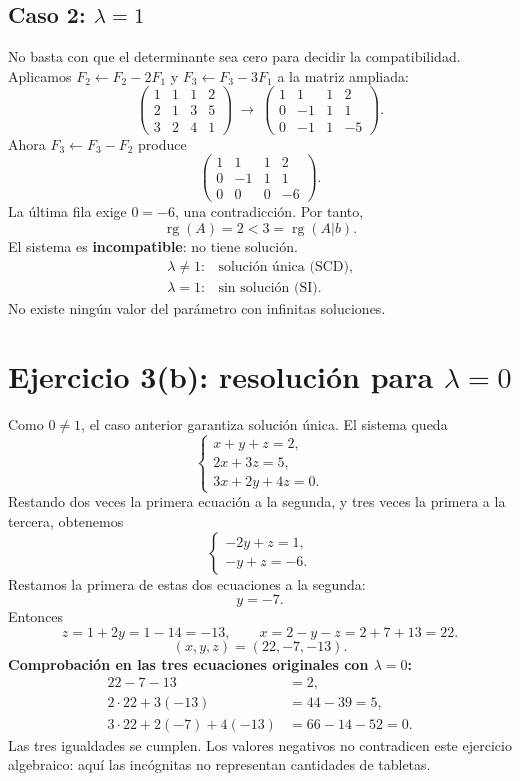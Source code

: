 \documentclass[11pt]{article}
\begin{document}
\subsection*{Caso 2: $\lambda=1$}
No basta con que el determinante sea cero para decidir la compatibilidad. Aplicamos $F_2\leftarrow F_2-2F_1$ y $F_3\leftarrow F_3-3F_1$ a la matriz ampliada:
\[
\left(\begin{array}{ccc|c}1&1&1&2\\2&1&3&5\\3&2&4&1\end{array}\right)
\ \longrightarrow\ 
\left(\begin{array}{ccc|c}1&1&1&2\\0&-1&1&1\\0&-1&1&-5\end{array}\right).
\]
Ahora $F_3\leftarrow F_3-F_2$ produce
\[
\left(\begin{array}{ccc|c}1&1&1&2\\0&-1&1&1\\0&0&0&-6\end{array}\right).
\]
La última fila exige $0=-6$, una contradicción. Por tanto,
\[\operatorname{rg}(A)=2<3=\operatorname{rg}(A|b).\]
El sistema es \textbf{incompatible}: no tiene solución.
\[
\boxed{\begin{array}{ll}\lambda\neq1:&\text{solución única (SCD)},\\\lambda=1:&\text{sin solución (SI)}.\end{array}}
\]
No existe ningún valor del parámetro con infinitas soluciones.
\clearpage
\section*{Ejercicio 3(b): resolución para $\lambda=0$}
Como $0\neq1$, el caso anterior garantiza solución única. El sistema queda
\[
\begin{cases}x+y+z=2,\\2x+3z=5,\\3x+2y+4z=0.\end{cases}
\]
Restando dos veces la primera ecuación a la segunda, y tres veces la primera a la tercera, obtenemos
\[
\begin{cases}-2y+z=1,\\-y+z=-6.\end{cases}
\]
Restamos la primera de estas dos ecuaciones a la segunda:
\[y=-7.\]
Entonces
\[z=1+2y=1-14=-13,\qquad x=2-y-z=2+7+13=22.\]
\[\boxed{(x,y,z)=(22,-7,-13)}.\]
\textbf{Comprobación en las tres ecuaciones originales con $\lambda=0$:}
\begin{align*}
22-7-13&=2,\\2\cdot22+3(-13)&=44-39=5,\\3\cdot22+2(-7)+4(-13)&=66-14-52=0.
\end{align*}
Las tres igualdades se cumplen. Los valores negativos no contradicen este ejercicio algebraico: aquí las incógnitas no representan cantidades de tabletas.
\end{document}
